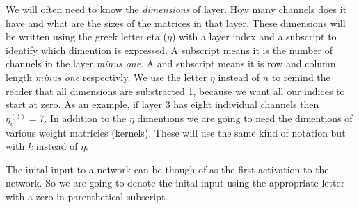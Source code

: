 We will often need to know the {\em dimensions} of layer.
How many channels does it have and what are the sizes of the matrices in that layer.
These dimensions will be written using the greek letter eta ($\eta$) with a layer index and a subscript to identify which dimention is expressed.
A  subscript means it is the number of channels in the layer {\em minus one}.
A  and  subscript means it is row and column length {\em minus one} respectivly.
We use the letter $\eta$ instead of $n$ to remind the reader that all dimensions are substracted 1, because we want all our indices to start at zero.
As an example, if layer $3$ has eight individual channels then $\eta^{(3)}_c = 7$.
In addition to the $\eta$ dimentions we are going to need the dimentions of various weight matricies (kernels).
These will use the same kind of notation but with $k$ instead of $\eta$.

The inital input to a network can be though of as the first activation to the network.
So we are going to denote the inital input using the appropriate  letter with a zero in parenthetical subscript.
\stopsubsubject


\startsubsection[title=Fully-connected layer]

\stopsubsection

\startsubsection[title=Convolutional layer]

\startsubsubsection[title=Where is the convolution?]
\stopsubsubsection
\stopsubsection

\startsubsection[title=Downsampling layer]

\stopsubsection

\startsubsection[title=The activation function]

\stopsubsection

\startsubsection[title=Output layer]

\stopsubsection